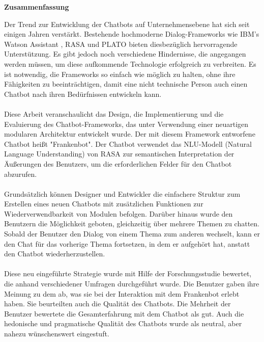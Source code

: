 \thispagestyle{empty}
\vspace*{0.2cm}

\begin{center}
    \textbf{Zusammenfassung}
\end{center}

\vspace*{0.2cm}

\noindent 
Der Trend zur Entwicklung der Chatbots auf Unternehmensebene hat sich seit einigen Jahren verstärkt. Bestehende hochmoderne Dialog-Frameworks wie IBM's Watson Assistant \cite{ibmwatson}, RASA \cite{rasa} und PLATO \cite{plato} bieten diesbezüglich hervorragende Unterstützung. Es gibt jedoch noch verschiedene Hindernisse, die angegangen werden müssen, um diese aufkommende Technologie erfolgreich zu verbreiten. Es ist notwendig, die Frameworks so einfach wie möglich zu halten, ohne ihre Fähigkeiten zu beeinträchtigen, damit eine nicht technische Person auch einen Chatbot nach ihren Bedürfnissen entwickeln kann.
\\~\\
Diese Arbeit veranschaulicht das Design, die Implementierung und die Evaluierung des Chatbot-Frameworks, das unter Verwendung einer neuartigen modularen Architektur entwickelt wurde. Der mit diesem Framework entworfene Chatbot heißt "Frankenbot". Der Chatbot verwendet das NLU-Modell (Natural Language Understanding) von RASA zur semantischen Interpretation der Äußerungen des Benutzers, um die erforderlichen Felder für den Chatbot abzurufen.
\\~\\
Grundsätzlich können Designer und Entwickler die einfachere Struktur zum Erstellen eines neuen Chatbots mit zusätzlichen Funktionen zur Wiederverwendbarkeit von Modulen befolgen. Darüber hinaus wurde den Benutzern die Möglichkeit geboten, gleichzeitig über mehrere Themen zu chatten. Sobald der Benutzer den Dialog von einem Thema zum anderen wechselt, kann er den Chat für das vorherige Thema fortsetzen, in dem er aufgehört hat, anstatt den Chatbot wiederherzustellen.
\\~\\
Diese neu eingeführte Strategie wurde mit Hilfe der Forschungsstudie bewertet, die anhand verschiedener Umfragen durchgeführt wurde. Die Benutzer gaben ihre Meinung zu dem ab, was sie bei der Interaktion mit dem Frankenbot erlebt haben. Sie beurteilten auch die Qualität des Chatbots. Die Mehrheit der Benutzer bewertete die Gesamterfahrung mit dem Chatbot als gut. Auch die hedonische und pragmatische Qualität des Chatbots wurde als neutral, aber nahezu wünschenswert eingestuft.